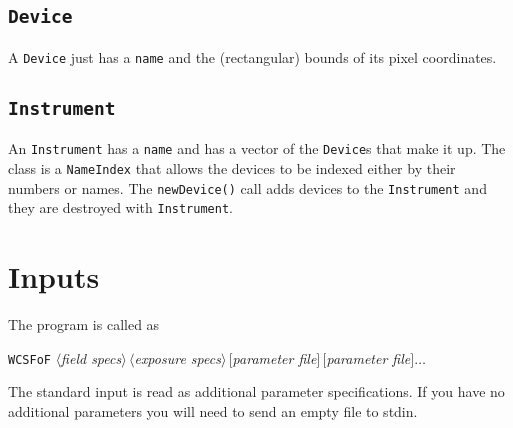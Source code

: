 \documentclass[11pt,preprint,flushrt]{aastex}
\begin{document}
\subsection{\tt Device}
A {\tt Device} just has a {\tt name} and the (rectangular) bounds of its pixel coordinates.

\subsection{\tt Instrument}
An {\tt Instrument} has a {\tt name} and has a vector of the {\tt Device}s that make it up.  The class is a {\tt NameIndex} that allows the devices to be indexed either by their numbers or names.  The {\tt newDevice()} call adds devices to the {\tt Instrument} and they are destroyed with {\tt Instrument}.

\section{Inputs}
The program is called as

{\tt WCSFoF} {\it $\langle$field specs$\rangle\,\langle$exposure specs$\rangle\, [$parameter file$]\,[$parameter file$]\ldots$}

The standard input is read as additional parameter specifications.  If you have no additional parameters you will need to send an empty file to stdin.  
\end{document}
